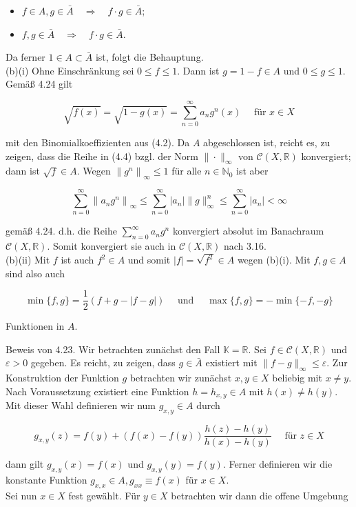 \documentclass[10pt, letterpaper]{article}
\begin{document}
\begin{itemize}
  \item $f \in A, g \in \bar{A} \quad \Longrightarrow \quad f \cdot g \in \bar{A}$;
  \item $f, g \in \bar{A} \quad \Longrightarrow \quad f \cdot g \in \bar{A}$.
\end{itemize}

Da ferner $1 \in A \subset \bar{A}$ ist, folgt die Behauptung.\\
(b)(i) Ohne Einschränkung sei $0 \leq f \leq 1$. Dann ist $g=1-f \in A$ und $0 \leq g \leq 1$. Gemäß 4.24 gilt

$$
\sqrt{f(x)}=\sqrt{1-g(x)}=\sum_{n=0}^{\infty} a_{n} g^{n}(x) \quad \text { für } x \in X
$$

mit den Binomialkoeffizienten aus (4.2). Da $A$ abgeschlossen ist, reicht es, zu zeigen, dass die Reihe in (4.4) bzgl. der Norm $\|\cdot\|_{\infty}$ von $\mathcal{C}(X, \mathbb{R})$ konvergiert; dann ist $\sqrt{f} \in A$. Wegen $\left\|g^{n}\right\|_{\infty} \leq 1$ für alle $n \in \mathbb{N}_{0}$ ist aber

$$
\sum_{n=0}^{\infty}\left\|a_{n} g^{n}\right\|_{\infty} \leq \sum_{n=0}^{\infty}\left|a_{n}\right|\|g\|_{\infty}^{n} \leq \sum_{n=0}^{\infty}\left|a_{n}\right|<\infty
$$

gemäß 4.24. d.h. die Reihe $\sum_{n=0}^{\infty} a_{n} g^{n}$ konvergiert absolut im Banachraum $\mathcal{C}(X, \mathbb{R})$. Somit konvergiert sie auch in $\mathcal{C}(X, \mathbb{R})$ nach 3.16.\\
(b)(ii) Mit $f$ ist auch $f^{2} \in A$ und somit $|f|=\sqrt{f^{2}} \in A$ wegen (b)(i). Mit $f, g \in A$ sind also auch

$$
\min \{f, g\}=\frac{1}{2}(f+g-|f-g|) \quad \text { und } \quad \max \{f, g\}=-\min \{-f,-g\}
$$

Funktionen in $A$.

Beweis von 4.23. Wir betrachten zunächst den Fall $\mathbb{K}=\mathbb{R}$. Sei $f \in \mathcal{C}(X, \mathbb{R})$ und $\varepsilon>0$ gegeben. Es reicht, zu zeigen, dass $g \in \bar{A}$ existiert mit $\|f-g\|_{\infty} \leq \varepsilon$. Zur Konstruktion der Funktion $g$ betrachten wir zunächst $x, y \in X$ beliebig mit $x \neq y$. Nach Voraussetzung existiert eine Funktion $h=h_{x, y} \in A$ mit $h(x) \neq h(y)$. Mit dieser Wahl definieren wir num $g_{x, y} \in A$ durch

$$
g_{x, y}(z)=f(y)+(f(x)-f(y)) \frac{h(z)-h(y)}{h(x)-h(y)} \quad \text { für } z \in X
$$

dann gilt $g_{x, y}(x)=f(x)$ und $g_{x, y}(y)=f(y)$. Ferner definieren wir die konstante Funktion $g_{x, x} \in A, g_{x x} \equiv f(x)$ für $x \in X$.\\
Sei nun $x \in X$ fest gewählt. Für $y \in X$ betrachten wir dann die offene Umgebung
\end{document}

